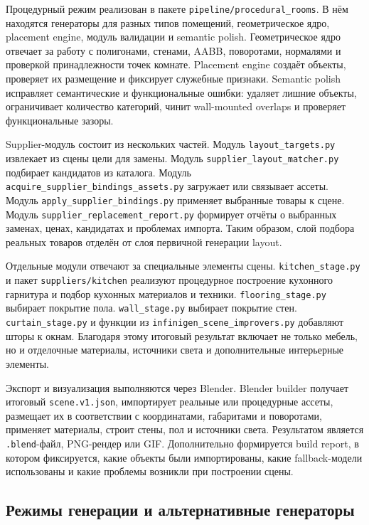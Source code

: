 \documentclass[times]{itmo-student-thesis}
\begin{document}
Процедурный режим реализован в пакете \texttt{pipeline/procedural\_rooms}. В нём находятся генераторы для разных типов помещений, геометрическое ядро, placement engine, модуль валидации и semantic polish. Геометрическое ядро отвечает за работу с полигонами, стенами, AABB, поворотами, нормалями и проверкой принадлежности точек комнате. Placement engine создаёт объекты, проверяет их размещение и фиксирует служебные признаки. Semantic polish исправляет семантические и функциональные ошибки: удаляет лишние объекты, ограничивает количество категорий, чинит wall-mounted overlaps и проверяет функциональные зазоры.

Supplier-модуль состоит из нескольких частей. Модуль \texttt{layout\_targets.py} извлекает из сцены цели для замены. Модуль \texttt{supplier\_layout\_matcher.py} подбирает кандидатов из каталога. Модуль \texttt{acquire\_supplier\_bindings\_assets.py} загружает или связывает ассеты. Модуль \texttt{apply\_supplier\_bindings.py} применяет выбранные товары к сцене. Модуль \texttt{supplier\_replacement\_report.py} формирует отчёты о выбранных заменах, ценах, кандидатах и проблемах импорта. Таким образом, слой подбора реальных товаров отделён от слоя первичной генерации layout.

Отдельные модули отвечают за специальные элементы сцены. \texttt{kitchen\_stage.py} и пакет \texttt{suppliers/kitchen} реализуют процедурное построение кухонного гарнитура и подбор кухонных материалов и техники. \texttt{flooring\_stage.py} выбирает покрытие пола. \texttt{wall\_stage.py} выбирает покрытие стен. \texttt{curtain\_stage.py} и функции из \texttt{infinigen\_scene\_improvers.py} добавляют шторы к окнам. Благодаря этому итоговый результат включает не только мебель, но и отделочные материалы, источники света и дополнительные интерьерные элементы.

Экспорт и визуализация выполняются через Blender. Blender builder получает итоговый \texttt{scene.v1.json}, импортирует реальные или процедурные ассеты, размещает их в соответствии с координатами, габаритами и поворотами, применяет материалы, строит стены, пол и источники света. Результатом является \texttt{.blend}-файл, PNG-рендер или GIF. Дополнительно формируется build report, в котором фиксируется, какие объекты были импортированы, какие fallback-модели использованы и какие проблемы возникли при построении сцены.

\subsection{Режимы генерации и альтернативные генераторы}
\end{document}
